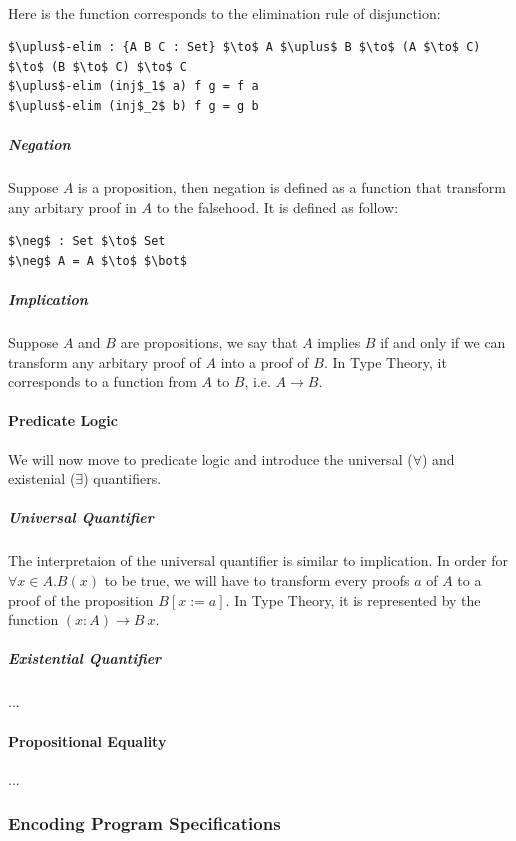 \documentclass[twoside,openright,final]{bhamthesis}
\begin{document}
\paragraph{} Here is the function corresponds to the elimination rule of
disjunction:
\begin{lstlisting}[mathescape=true,xleftmargin=.2\textwidth]
$\uplus$-elim : {A B C : Set} $\to$ A $\uplus$ B $\to$ (A $\to$ C) $\to$ (B $\to$ C) $\to$ C
$\uplus$-elim (inj$_1$ a) f g = f a
$\uplus$-elim (inj$_2$ b) f g = g b
\end{lstlisting} 

\subparagraph{Negation} Suppose \(A\) is a proposition, then negation is
defined as a function that transform any arbitary proof in \(A\) to
the falsehood. It is defined as follow: 
\begin{lstlisting}[mathescape=true,xleftmargin=.3\textwidth]
$\neg$ : Set $\to$ Set
$\neg$ A = A $\to$ $\bot$
\end{lstlisting} 

\subparagraph{Implication} Suppose \(A\) and \(B\) are propositions,
we say that \(A\) implies \(B\) if and only if we can
transform any arbitary proof of \(A\) into a proof of \(B\). In Type
Theory, it corresponds to a function from \(A\) to \(B\), i.e. \(A \to
B\). 

\paragraph{Predicate Logic} We will now move to predicate logic and
introduce the universal (\(\forall\)) and existenial (\(\exists\)) quantifiers. 

\subparagraph{Universal Quantifier} The interpretaion of the universal quantifier is similar to
implication. In order for \(\forall x\in A. B(x)\) to be true, we will have
to transform every proofs \(a\) of \(A\) to a proof of the proposition
\(B[x:=a]\). In Type Theory, it is represented by the function \((x :
A) \to B\ x\). 

\subparagraph{Existential Quantifier} ...

\paragraph{Propositional Equality} ... 

\subsubsection{Encoding Program Specifications}
\end{document}
